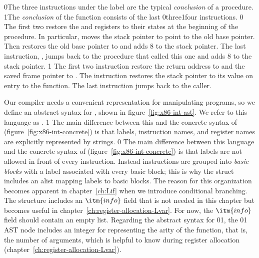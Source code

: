 \documentclass[7x10]{TimesAPriori_MIT}%
\def\racketEd{0}
\def\pythonEd{1}
\def\edition{1}
\def\xeightysixEd{0}
\def\riscvEd{1}
\def\architecture{1}
\newcommand\ifriscv[1]{\if\architecture\riscvEd{#1}\fi}
\newcommand\ifxeightsix[1]{\if\architecture\xeightysixEd{#1}\fi}
\newcommand{\racket}[1]{{\if\edition\racketEd{#1}\fi}}
\newcommand{\pythonColor}[0]{}
\newcommand{\python}[1]{{\if\edition\pythonEd\pythonColor #1\fi}}
\numberwithin{theorem}{chapter}
\numberwithin{definition}{chapter}
\numberwithin{equation}{chapter}
\begin{document}
\racket{The three instructions under the label  are the
  typical \emph{conclusion} of a procedure.}
%
\python{The \emph{conclusion}\index{subject}{conclusion} of the
  \code{main} function consists of the last \ifxeightsix{three}\ifriscv{four} instructions.}
%
\if\architecture\xeightysixEd
The first two restore the  and  registers to their
states at the beginning of the procedure. In particular,
 moves the stack pointer to point to the
old base pointer. Then  restores the old base pointer
to  and adds $8$ to the stack pointer.  The last instruction,
, jumps back to the procedure that called this one and adds
$8$ to the stack pointer.
\fi
\if\architecture\riscvEd
The first two instruction restore the return address to   and
the saved frame pointer to . The instruction  restores the stack pointer to its value on entry to the
function. The last instruction  jumps back to the caller.
\fi

Our compiler needs a convenient representation for manipulating {\ArchName}
programs, so we define an abstract syntax for {\ArchName}, shown in
figure~\ref{fig:x86-int-ast}. We refer to this language as
\LangXInt{}.
%
{\if\edition\pythonEd\pythonColor%
  The main difference between this and the concrete syntax of \LangXInt{}
  (figure~\ref{fig:x86-int-concrete}) is that labels, instruction
  names, and register names are explicitly represented by strings. 
\fi} %
{\if\edition\racketEd  
The main difference between this language and the concrete syntax of \LangXInt{}
(figure~\ref{fig:x86-int-concrete}) is that labels are not allowed in
front of every instruction. Instead instructions are grouped into
\emph{basic blocks} with a
label associated with every basic block; this is why the 
struct includes an alist mapping labels to basic blocks. The reason for this
organization becomes apparent in chapter~\ref{ch:Lif} when we
introduce conditional branching. The  structure includes
an $\itm{info}$ field that is not needed in this chapter but becomes
useful in chapter~\ref{ch:register-allocation-Lvar}.  For now, the
$\itm{info}$ field should contain an empty list.
\fi}
%
Regarding the abstract syntax for
\ifxeightsix{}\ifriscv{}, the
\ifxeightsix{}\ifriscv{} AST 
node includes an integer for representing the arity of the function,
that is, the number of arguments, which is helpful to know during
register allocation (chapter~\ref{ch:register-allocation-Lvar}).
\end{document}

